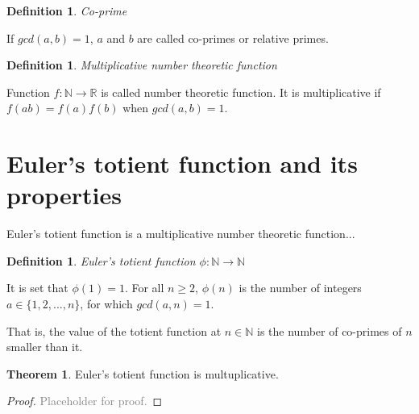 \documentclass{article}
\theoremstyle{definition}
\newtheorem{definition}[subsubsection]{Definition}
\newtheorem{theorem}[subsubsection]{Theorem}
\begin{document}
\begin{definition}{\emph{Co-prime}}

If $gcd(a,b) = 1$, $a$ and $b$ are called co-primes or relative primes.

\end{definition}

\begin{definition}{\emph{Multiplicative number theoretic function}}

Function $f: \mathbb{N} \rightarrow \mathbb{R}$ is called number theoretic function. It is multiplicative if $f(ab) = f(a)f(b)$ when $gcd(a, b)=1$.

\end{definition}

\section{Euler's totient function and its properties}

Euler's totient function is a multiplicative number theoretic function...

\begin{definition}{\emph{Euler's totient function $\phi: \mathbb{N} \rightarrow \mathbb{N}$}}

It is set that $\phi(1) = 1$. For all $n \geq 2$, $\phi(n)$ is the number of integers $a \in \{1,2,...,n\}$, for which $gcd(a,n) = 1$.


\end{definition}

That is, the value of the totient function at $n \in \mathbb{N}$ is the number of co-primes of $n$ smaller than it.

\begin{theorem}
Euler's totient function is multuplicative.
\begin{proof}
\textcolor{gray}{Placeholder for proof.}
\end{proof}
\end{theorem}
\end{document}
